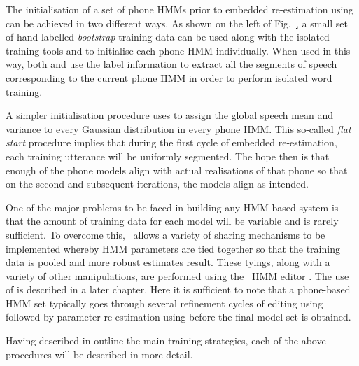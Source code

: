 The initialisation of a 
set of phone HMMs prior to embedded re-estimation
using  can be achieved in two different ways.  As shown on the
left of Fig.~\href{f:subword}, a small set of hand-labelled 
\textit{bootstrap} training data can be used along with
the isolated training tools  and  to
initialise each phone HMM individually.  When used in this way,
both  and  use the label information
to extract all the segments of speech corresponding to the current
phone HMM in order to perform isolated word training.   

A simpler initialisation procedure uses  to assign the global
speech mean and variance to every Gaussian distribution in every phone
HMM.  This so-called \textit{flat start} procedure implies that during the
first cycle of embedded re-estimation, each training utterance will be
uniformly segmented.  The hope then is that enough of the phone models
align with actual realisations of that phone so that on the second and
subsequent iterations, the models align as intended.

One of the major problems to be faced in building any HMM-based
system is that the amount of training data for each model will be
variable and is rarely sufficient.  To overcome this, \HTK\ allows
a variety of sharing mechanisms to be implemented whereby HMM parameters
are tied together so that the training data is pooled and more robust
estimates result.  These tyings, along with a variety of other
manipulations, are performed using the  \HTK\ HMM editor .
The use of  is 
described in a later chapter.  Here it is
sufficient to note that a phone-based HMM set typically goes through
several refinement cycles of editing using  followed
by parameter re-estimation using  before the final model set is
obtained.

Having described in outline the main training strategies, each
of the above procedures will be described in more detail.


